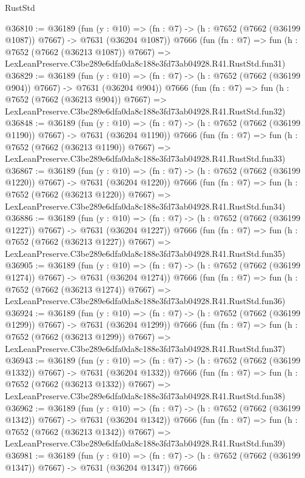 \begin{lexlean}{RustStd}
\begin{coremodule}
@36810 := @36189
    (fun (y : @10) => (fn : @7) -> (h : @7652 (@7662 (@36199 @1087)) @7667) -> @7631 (@36204 @1087))
    @7666
    (fun (fn : @7) =>
    fun (h : @7652 (@7662 (@36213 @1087)) @7667) =>
    LexLeanPreserve.C3be289e6dfa0da8c188e3fd73ab04928.R41.RustStd.fun31)
@36829 := @36189
    (fun (y : @10) => (fn : @7) -> (h : @7652 (@7662 (@36199 @904)) @7667) -> @7631 (@36204 @904))
    @7666
    (fun (fn : @7) =>
    fun (h : @7652 (@7662 (@36213 @904)) @7667) =>
    LexLeanPreserve.C3be289e6dfa0da8c188e3fd73ab04928.R41.RustStd.fun32)
@36848 := @36189
    (fun (y : @10) => (fn : @7) -> (h : @7652 (@7662 (@36199 @1190)) @7667) -> @7631 (@36204 @1190))
    @7666
    (fun (fn : @7) =>
    fun (h : @7652 (@7662 (@36213 @1190)) @7667) =>
    LexLeanPreserve.C3be289e6dfa0da8c188e3fd73ab04928.R41.RustStd.fun33)
@36867 := @36189
    (fun (y : @10) => (fn : @7) -> (h : @7652 (@7662 (@36199 @1220)) @7667) -> @7631 (@36204 @1220))
    @7666
    (fun (fn : @7) =>
    fun (h : @7652 (@7662 (@36213 @1220)) @7667) =>
    LexLeanPreserve.C3be289e6dfa0da8c188e3fd73ab04928.R41.RustStd.fun34)
@36886 := @36189
    (fun (y : @10) => (fn : @7) -> (h : @7652 (@7662 (@36199 @1227)) @7667) -> @7631 (@36204 @1227))
    @7666
    (fun (fn : @7) =>
    fun (h : @7652 (@7662 (@36213 @1227)) @7667) =>
    LexLeanPreserve.C3be289e6dfa0da8c188e3fd73ab04928.R41.RustStd.fun35)
@36905 := @36189
    (fun (y : @10) => (fn : @7) -> (h : @7652 (@7662 (@36199 @1274)) @7667) -> @7631 (@36204 @1274))
    @7666
    (fun (fn : @7) =>
    fun (h : @7652 (@7662 (@36213 @1274)) @7667) =>
    LexLeanPreserve.C3be289e6dfa0da8c188e3fd73ab04928.R41.RustStd.fun36)
@36924 := @36189
    (fun (y : @10) => (fn : @7) -> (h : @7652 (@7662 (@36199 @1299)) @7667) -> @7631 (@36204 @1299))
    @7666
    (fun (fn : @7) =>
    fun (h : @7652 (@7662 (@36213 @1299)) @7667) =>
    LexLeanPreserve.C3be289e6dfa0da8c188e3fd73ab04928.R41.RustStd.fun37)
@36943 := @36189
    (fun (y : @10) => (fn : @7) -> (h : @7652 (@7662 (@36199 @1332)) @7667) -> @7631 (@36204 @1332))
    @7666
    (fun (fn : @7) =>
    fun (h : @7652 (@7662 (@36213 @1332)) @7667) =>
    LexLeanPreserve.C3be289e6dfa0da8c188e3fd73ab04928.R41.RustStd.fun38)
@36962 := @36189
    (fun (y : @10) => (fn : @7) -> (h : @7652 (@7662 (@36199 @1342)) @7667) -> @7631 (@36204 @1342))
    @7666
    (fun (fn : @7) =>
    fun (h : @7652 (@7662 (@36213 @1342)) @7667) =>
    LexLeanPreserve.C3be289e6dfa0da8c188e3fd73ab04928.R41.RustStd.fun39)
@36981 := @36189
    (fun (y : @10) => (fn : @7) -> (h : @7652 (@7662 (@36199 @1347)) @7667) -> @7631 (@36204 @1347))
    @7666

\end{coremodule}
\end{lexlean}
